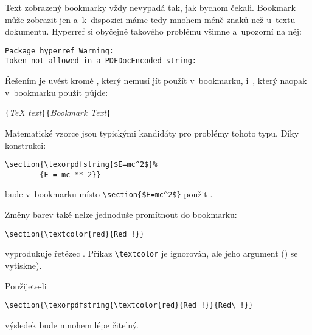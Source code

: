 Text zobrazený bookmarky vždy nevypadá tak, jak bychom čekali.
Book\-mark může zobrazit jen  a~k~dispozici máme
tedy mnohem méně znaků než u~textu dokumentu. Hyperref si
obyčejně takového problému všimne a~upozorní na něj:
\begin{code}
\begin{verbatim}
Package hyperref Warning: 
Token not allowed in a PDFDocEncoded string:
\end{verbatim}
\end{code}
Řešením je uvést kromě , který nemusí jít
použít v~book\-mar\-ku, i~, který naopak
v~bookmarku použít půjde:
\begin{lscommand}
\verb|{|\emph{\TeX{} text}\verb|}{|\emph{Bookmark Text}\verb|}|
\end{lscommand}


Matematické vzorce jsou typickými kandidáty pro problémy tohoto
typu. Díky konstrukci:
\begin{code}
\begin{verbatim}
\section{\texorpdfstring{$E=mc^2$}%
        {E = mc ** 2}}
\end{verbatim}
\end{code}
bude v~bookmarku místo  \verb+\section{$E=mc^2$}+
použit  .

Změny barev také nelze jednoduše promítnout do bookmarku:
\begin{code}
\verb+\section{\textcolor{red}{Red !}}+
\end{code}
vyprodukuje řetězec . Příkaz \verb+\textcolor+ je ignorován,
ale jeho argument () se vytiskne).

Použijete-li
\begin{code}
\verb+\section{\texorpdfstring{\textcolor{red}{Red !}}{Red\ !}}+
\end{code}
výsledek bude mnohem lépe čitelný.

